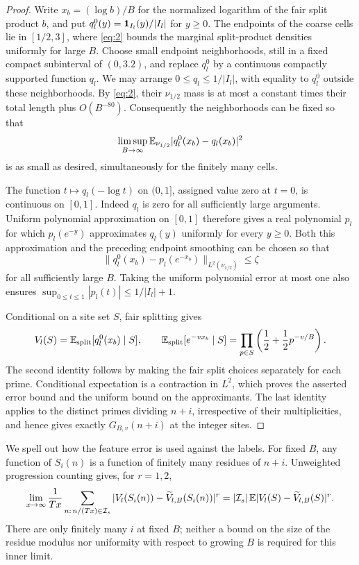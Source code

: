 \begin{proof}
Write $x_b=(\log b)/B$ for the normalized logarithm of the fair split
product $b$, and put $q_l^0(y)=\mathbf 1_{I_l}(y)/|I_l|$ for $y\ge0$.  The endpoints of the
coarse cells lie in $[1/2,3]$, where \eqref{eq:2} bounds the marginal
split-product densities uniformly for large $B$.  Choose small endpoint
neighborhoods, still in a fixed compact subinterval of $(0,3.2)$, and
replace $q_l^0$ by a continuous compactly supported function $q_l$.
We may arrange $0\le q_l\le1/|I_l|$, with equality to $q_l^0$ outside
these neighborhoods.  By \eqref{eq:2}, their $\nu_{1/2}$ mass is at
most a constant times their total length plus $O(B^{-80})$.
Consequently the neighborhoods can be fixed so that
\[
 \limsup_{B\to\infty}
   \mathbb E_{\nu_{1/2}}|q_l^0(x_b)-q_l(x_b)|^2
\]
is as small as desired, simultaneously for the finitely many cells.

The function $t\mapsto q_l(-\log t)$ on $(0,1]$, assigned value zero
at $t=0$, is continuous on $[0,1]$.  Indeed $q_l$ is zero for all
sufficiently large arguments.  Uniform polynomial approximation on
$[0,1]$ therefore gives a real polynomial $p_l$ for which
$p_l(e^{-y})$ approximates $q_l(y)$ uniformly for every $y\ge0$.
Both this approximation and the preceding endpoint smoothing can be
chosen so that
\[
 \bigl\|q_l^0(x_b)-p_l(e^{-x_b})\bigr\|_{L^2(\nu_{1/2})}
 \le\zeta
\]
for all sufficiently large $B$.  Taking the uniform polynomial error
at most one also ensures
$\sup_{0\le t\le1}|p_l(t)|\le1/|I_l|+1$.

Conditional on a site set $S$, fair splitting gives
\[
 V_l(S)=\mathbb E_{\mathrm{split}}[q_l^0(x_b)\mid S],
 \qquad
 \mathbb E_{\mathrm{split}}[e^{-v x_b}\mid S]
      =\prod_{p\in S}\left(\frac12+\frac12p^{-v/B}\right).
\]
The second identity follows by making the fair split choices separately
for each prime.  Conditional expectation is a contraction in $L^2$,
which proves the asserted error bound and the uniform bound on the
approximants.  The last identity applies to the distinct primes dividing
$n+i$, irrespective of their multiplicities, and hence gives exactly
$G_{B,v}(n+i)$ at the integer sites.
\end{proof}

We spell out how the feature error is used against the labels.
For fixed $B$, any function of $S_i(n)$ is a function of finitely many
residues of $n+i$.  Unweighted progression counting gives, for $r=1,2$,
\begin{equation}
 \lim_{x\to\infty}\frac1{Tx}
    \sum_{n:\,n/(Tx)\in\mathcal I_s}
       |V_l(S_i(n))-\widetilde V_{l,B}(S_i(n))|^r
 =|\mathcal I_s|\,
       \mathbb E|V_l(S)-\widetilde V_{l,B}(S)|^r.
 \label{eq:conclusion-feature-counting}
\end{equation}
There are only finitely many $i$ at fixed $B$; neither a bound on the
size of the residue modulus nor uniformity with respect to growing $B$
is required for this inner limit.

